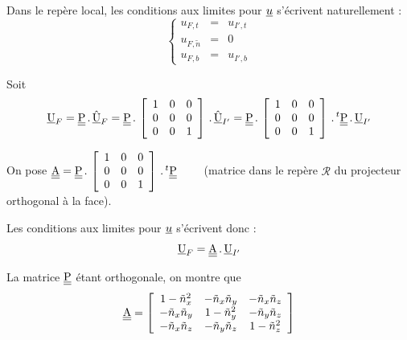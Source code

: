 Dans le rep\`ere local, les conditions aux limites pour $\underline{u}$ s'\'ecrivent
naturellement :\\
\begin{equation}
\left\{\begin{array}{lcl}
u_{F,t} & = & u_{I',t}\\
u_{F,\tilde{n}} & = & 0\\
u_{F,b} & = & u_{I',b}
\end{array}\right.
\end{equation}

Soit
\begin{equation}
\underline{\textrm{U}}_F = \underline{\underline{\textrm{P}}}\,.\,\hat{\underline{\textrm{U}}}_F
= \underline{\underline{\textrm{P}}}\,.\,\left[
\begin{array}{ccc}
1 & 0 & 0\\
0 & 0 & 0\\
0 & 0 & 1
\end{array}
\right]\,.\,\hat{\underline{\textrm{U}}}_{I'}
=\underline{\underline{\textrm{P}}}\,.\,\left[
\begin{array}{ccc}
1 & 0 & 0\\
0 & 0 & 0\\
0 & 0 & 1
\end{array}
\right]\,.\,^t\underline{\underline{\textrm{P}}}\,.\,\underline{\textrm{U}}_{I'}
\end{equation}


On pose
$\underline{\underline{\textrm{A}}}=\underline{\underline{\textrm{P}}}\,.\,\left[
\begin{array}{ccc}
1 & 0 & 0\\
0 & 0 & 0\\
0 & 0 & 1
\end{array}
\right]\,.\,^t\underline{\underline{\textrm{P}}}\qquad$ (matrice dans le rep\`ere $\mathcal{R}$ du projecteur
orthogonal \`a la face).

Les conditions aux limites pour $\underline{u}$ s'\'ecrivent donc :
\begin{equation}
\underline{\textrm{U}}_F = \underline{\underline{\textrm{A}}}\,.\,\underline{\textrm{U}}_{I'}
\end{equation}

La matrice $\underline{\underline{\textrm{P}}}$ \'etant orthogonale, on montre que
\begin{equation}
\underline{\underline{\textrm{A}}}=\left[
\begin{array}{ccc}
1-\tilde{n}_x^2 & -\tilde{n}_x\tilde{n}_y & -\tilde{n}_x\tilde{n}_z\\
-\tilde{n}_x\tilde{n}_y & 1-\tilde{n}_y^2 & -\tilde{n}_y\tilde{n}_z\\
-\tilde{n}_x\tilde{n}_z & -\tilde{n}_y\tilde{n}_z & 1-\tilde{n}_z^2
\end{array}\right]
\end{equation}

